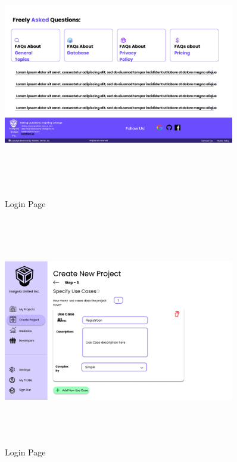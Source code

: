\begin{figure}[H]
\includegraphics[height=10cm, width=0.9\textwidth]{./images/prototype/0016}
\centering 
\caption{Login Page}
\label{fig:prototype1}

\includegraphics[height=10cm, width=0.9\textwidth]{./images/prototype/0017}
\centering 
\caption{Login Page}
\label{fig:prototype1}
\end{figure}

